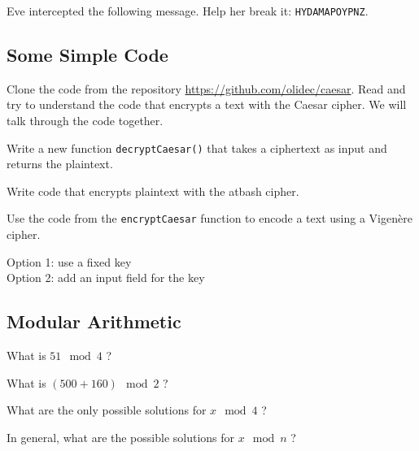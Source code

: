 \documentclass[11pt,a4paper]{report}
\begin{document}
\begin{ex}
Eve intercepted the following message. Help her break it: \verb|HYDAMAPOYPNZ|.
\end{ex}



\newpage

\subsection{Some Simple Code}
\begin{ex}
Clone the code from the repository \url{https://github.com/olidec/caesar}. Read and try to understand the code that encrypts a text with the Caesar cipher. We will talk through the code together.
\end{ex}

\begin{ex}
Write a new function \verb|decryptCaesar()| that takes a ciphertext as input and returns the plaintext.
\end{ex}

\begin{ex}
Write code that encrypts plaintext with the atbash cipher. 
\end{ex}

\begin{ex}
Use the code from the \verb|encryptCaesar| function to encode a text using a Vigenère cipher. 

Option 1: use a fixed key \\
Option 2: add an input field for the key
\end{ex}





\subsection{Modular Arithmetic}

\begin{ex}
What is $51\mod 4$ ?
\end{ex}

\begin{ex}
What is $(500 + 160) \mod 2$ ?
\end{ex}


\begin{ex}
What are the only possible solutions for $x\mod 4$ ?
\end{ex}


\begin{ex}
In general, what are the possible solutions for $x\mod n$ ?
\end{ex}
\end{document}
